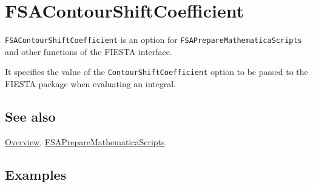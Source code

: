 \documentclass[../FeynHelpersManual.tex]{subfiles}
\begin{document}
\hypertarget{fsacontourshiftcoefficient}{
\section{FSAContourShiftCoefficient}\label{fsacontourshiftcoefficient}}

\texttt{FSAContourShiftCoefficient} is an option for
\texttt{FSAPrepareMathematicaScripts} and other functions of the FIESTA
interface.

It specifies the value of the \texttt{ContourShiftCoefficient} option to
be passed to the FIESTA package when evaluating an integral.

\subsection{See also}

\hyperlink{toc}{Overview},
\hyperlink{fsapreparemathematicascripts}{FSAPrepareMathematicaScripts}.

\subsection{Examples}
\end{document}
